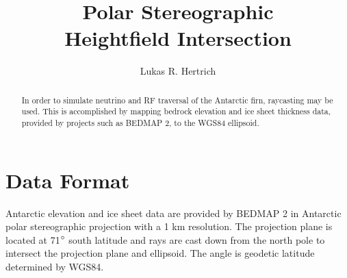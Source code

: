 \documentclass[aps,ams,prl,twocolumn,superscriptaddress,10pt]{revtex4-1}
\begin{document}
\pagestyle{headings}

\title{Polar Stereographic\\ Heightfield Intersection}

\author{Lukas R. Hertrich}

\begin{abstract}
In order to simulate neutrino and RF traversal of the Antarctic firn, raycasting may be used. This is accomplished by mapping bedrock elevation and ice sheet thickness
data, provided by projects such as BEDMAP 2, to the WGS84 ellipsoid.
\end{abstract}

\maketitle

\section{Data Format}
Antarctic elevation and ice sheet data are provided by BEDMAP 2 in Antarctic polar stereographic projection with a 1 km resolution.
The projection plane is located at 71$\degree$ south latitude and rays are cast down from the north pole to intersect the projection plane and ellipsoid.
The angle is geodetic latitude determined by WGS84.
\end{document}
